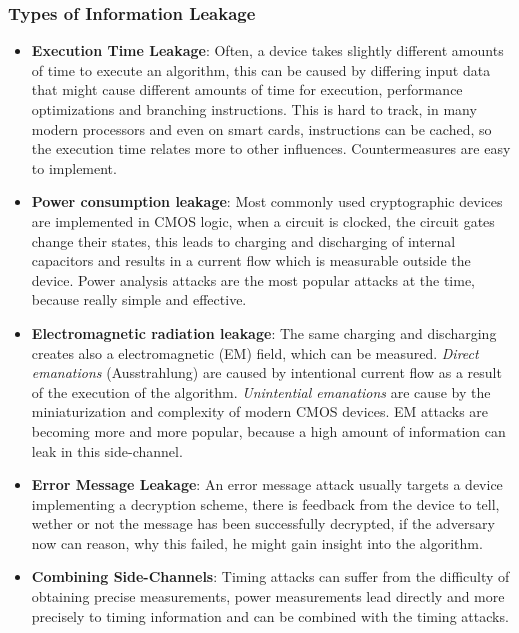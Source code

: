 \documentclass[a4paper, 10 pt, conference]{ieeeconf}
\begin{document}
\subsubsection{\textbf{Types of Information Leakage}}
\label{infoleak}
\begin{itemize}
\item \textbf{Execution Time Leakage}: Often, a device takes slightly different amounts of time to execute an algorithm, this can be caused by differing input data that might cause different amounts of time for execution, performance optimizations and branching instructions. 
This is hard to track, in many modern processors and even on smart cards, instructions can be cached, so the execution time relates more to other influences. Countermeasures are easy to implement. 
\item \textbf{Power consumption leakage}: Most commonly used cryptographic devices are implemented in CMOS logic, when a circuit is clocked, the circuit gates change their states, this leads to charging and discharging of internal capacitors and results in a current flow which is measurable outside the device. Power analysis attacks are the most popular attacks at the time, because really simple and effective. 
\item \textbf{Electromagnetic radiation leakage}: The same charging and discharging creates also a electromagnetic (EM) field, which can be measured. \emph{Direct emanations} (Ausstrahlung) are caused by intentional current flow as a result of the execution of the algorithm. \emph{Unintential emanations} are cause by the miniaturization and complexity of modern CMOS devices. EM attacks are becoming more and more popular, because a high amount of information can leak in this side-channel. 
\item \textbf{Error Message Leakage}: An error message attack usually targets a device implementing a decryption scheme, there is feedback from the device to tell, wether or not the message has been successfully decrypted, if the adversary now can reason, why this failed, he might gain insight into the algorithm. 
\item \textbf{Combining Side-Channels}: Timing attacks can suffer from the difficulty of obtaining precise measurements, power measurements lead directly and more precisely to timing information and can be combined with the timing attacks. 	 
\end{itemize}
\vspace{0.5cm}
\end{document}
